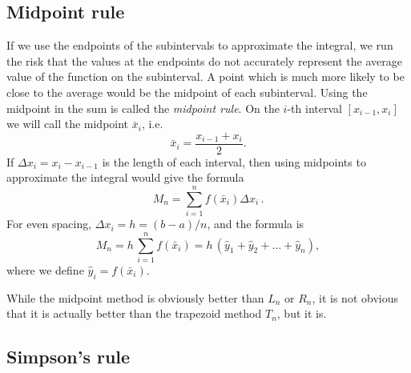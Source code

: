 
\subsection*{Midpoint rule}

If we use the endpoints of the subintervals to approximate the
integral, we run the risk that the values at the endpoints do not
accurately represent the average value of the function on the
subinterval. A point which is much more likely to be close to the
average would be the midpoint of each subinterval.  Using the midpoint
in the sum is called the {\em midpoint rule}. On the $i$-th interval
$[x_{i-1},x_i]$ we will call the midpoint $\bar{x}_i$, i.e.
$$
        \bar{x}_i = \frac{ x_{i-1} + x_i}{2}.
$$
If $\Delta x_i = x_i - x_{i-1}$ is the length of each interval, then using
midpoints to approximate the integral would give the formula
$$
   M_n = \sum_{i=1}^n f(\bar{x}_i) \Delta x_i
\,.
$$
For even spacing, $\Delta x_i = h = (b-a)/n$, and the formula is
\begin{equation}\label{evenmid}
   M_n = h \, \sum_{i=1}^{n} f(\bar{x}_i)
             = h \, (\hat{y}_1 + \hat{y}_2 + \ldots + \hat{y}_n),
\end{equation}
where we define $\hat{y}_i = f(\bar{x}_i)$.

While the midpoint method is obviously better than $L_n$ or $R_n$, it
is not obvious that it is actually better than the trapezoid method $T_n$,
but it is.



\subsection*{Simpson's rule}


